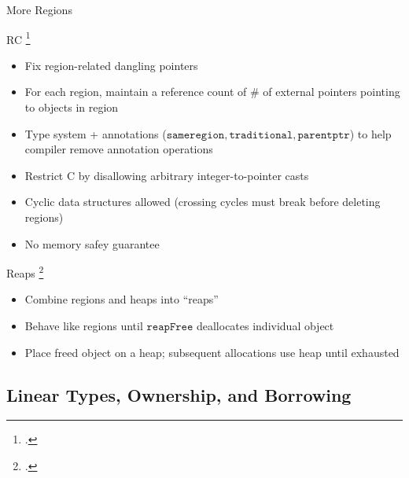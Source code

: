 \documentclass[aspectratio=169]{beamer}
\begin{document}
\begin{frame}{More Regions}
    \footnotesize{
RC \footcite{gay_language_2001}
    \vspace{-0.1in}
   \begin{itemize}
     \item Fix region-related dangling pointers %
     \item For each region, maintain a reference count of \# of external pointers pointing to objects in region %
     \item Type system + annotations ($\texttt{sameregion}, \texttt{traditional}, \texttt{parentptr}$) to help compiler remove annotation operations %
     \item Restrict C by disallowing arbitrary integer-to-pointer casts
     \item Cyclic data structures allowed (crossing cycles must break before deleting regions)
     \item No memory safey guarantee
   \end{itemize}
Reaps \footcite{berger_reconsidering_2002}
    \vspace{-0.1in}
   \begin{itemize}
     \item Combine regions and heaps into ``reaps''
     \item Behave like regions until $\texttt{reapFree}$ deallocates individual object
     \item Place freed object on a heap; subsequent allocations use heap until exhausted
   \end{itemize}
}
    \vspace{0.2in}
\end{frame}


\subsection{Linear Types, Ownership, and Borrowing}
\end{document}
